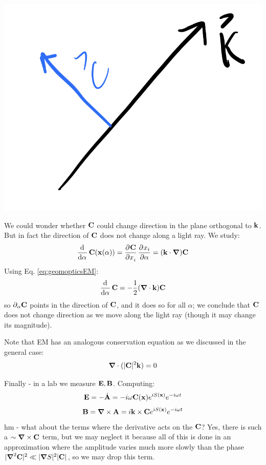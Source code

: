 \begin{center}
    \includegraphics[scale=0.3]{Lectures/Images/lec17-Ck.png}
\end{center}

We could wonder whether $\mathbf{C}$ could change direction in the plane orthogonal to $\mathbf{k}$. But in fact the direction of $\mathbf{C}$ does not change along a light ray. We study:
\begin{equation}
    \dod{}{\alpha}\v{C}(\v{x}(\alpha)) = \dpd{\v{C}}{x_i}\dpd{x_i}{\alpha} = (\v{k} \cdot \nabla)\v{C}
\end{equation}
Using Eq. \eqref{eq:geomopticsEM}:
\begin{equation}
    \dod{}{\alpha}\v{C} = -\frac{1}{2}(\nabla \cdot\v{k})\v{C}
\end{equation}
so $\partial_\alpha \mathbf{C}$ points in the direction of $\mathbf{C}$, and it does so for all $\alpha$; we conclude that $\mathbf{C}$ does not change direction as we move along the light ray (though it may change its magnitude).

Note that EM has an analogous conservation equation as we discussed in the general case:
\begin{equation}
    \nabla \cdot (\abs{\v{C}}^2\v{k}) = 0
\end{equation}

Finally - in a lab we measure $\mathbf{E}, \mathbf{B}$. Computing:
\begin{equation}
    \mathbf{E} = -\dot{\mathbf{A}} = -i\omega \mathbf{C}(\mathbf{x})e^{iS(\mathbf{x})}e^{-i\omega t}
\end{equation}
\begin{equation}
    \v{B} = \nabla \times \v{A} = i\v{k} \times \v{C}e^{iS(\v{x})}e^{-i\omega t}
\end{equation}
hm - what about the terms where the derivative acts on the $\mathbf{C}$? Yes, there is such a $\sim \nabla \times \v{C}$ term, but we may neglect it because all of this is done in an approximation where the amplitude varies much more slowly than the phase $\abs{\nabla^2 \v{C}}^2 \ll \abs{\nabla S}^2\abs{\v{C}}$, so we may drop this term.

